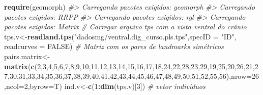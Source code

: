 \documentclass[
]{book}
\newenvironment{Shaded}{\begin{snugshade}}{\end{snugshade}}
\newcommand{\AttributeTok}[1]{\textcolor[rgb]{0.13,0.29,0.53}{#1}}
\newcommand{\CommentTok}[1]{\textcolor[rgb]{0.56,0.35,0.01}{\textit{#1}}}
\newcommand{\ConstantTok}[1]{\textcolor[rgb]{0.56,0.35,0.01}{#1}}
\newcommand{\DecValTok}[1]{\textcolor[rgb]{0.00,0.00,0.81}{#1}}
\newcommand{\FunctionTok}[1]{\textcolor[rgb]{0.13,0.29,0.53}{\textbf{#1}}}
\newcommand{\NormalTok}[1]{#1}
\newcommand{\OtherTok}[1]{\textcolor[rgb]{0.56,0.35,0.01}{#1}}
\newcommand{\SpecialCharTok}[1]{\textcolor[rgb]{0.81,0.36,0.00}{\textbf{#1}}}
\newcommand{\StringTok}[1]{\textcolor[rgb]{0.31,0.60,0.02}{#1}}
\begin{document}
\begin{Shaded}
\begin{Highlighting}[]
\FunctionTok{require}\NormalTok{(geomorph)}
\CommentTok{\#\textgreater{} Carregando pacotes exigidos: geomorph}
\CommentTok{\#\textgreater{} Carregando pacotes exigidos: RRPP}
\CommentTok{\#\textgreater{} Carregando pacotes exigidos: rgl}
\CommentTok{\#\textgreater{} Carregando pacotes exigidos: Matrix}
\CommentTok{\# Carregar arquivo tps com a vista ventral do crânio}
\NormalTok{tps.v}\OtherTok{\textless{}{-}}\FunctionTok{readland.tps}\NormalTok{(}\StringTok{"dadosmg/ventral.dig\_curso.pls.tps"}\NormalTok{,}\AttributeTok{specID =} \StringTok{"ID"}\NormalTok{, }\AttributeTok{readcurves =} \ConstantTok{FALSE}\NormalTok{)}
\CommentTok{\# Matriz com os pares de landmarks simétricos}
\NormalTok{pairs.matrix}\OtherTok{\textless{}{-}}
\FunctionTok{matrix}\NormalTok{(}\FunctionTok{c}\NormalTok{(}\DecValTok{2}\NormalTok{,}\DecValTok{3}\NormalTok{,}\DecValTok{4}\NormalTok{,}\DecValTok{5}\NormalTok{,}\DecValTok{6}\NormalTok{,}\DecValTok{7}\NormalTok{,}\DecValTok{8}\NormalTok{,}\DecValTok{9}\NormalTok{,}\DecValTok{10}\NormalTok{,}\DecValTok{11}\NormalTok{,}\DecValTok{12}\NormalTok{,}\DecValTok{13}\NormalTok{,}\DecValTok{14}\NormalTok{,}\DecValTok{15}\NormalTok{,}\DecValTok{16}\NormalTok{,}\DecValTok{17}\NormalTok{,}\DecValTok{18}\NormalTok{,}\DecValTok{24}\NormalTok{,}\DecValTok{22}\NormalTok{,}\DecValTok{28}\NormalTok{,}\DecValTok{23}\NormalTok{,}\DecValTok{29}\NormalTok{,}\DecValTok{19}\NormalTok{,}\DecValTok{25}\NormalTok{,}\DecValTok{20}\NormalTok{,}\DecValTok{26}\NormalTok{,}\DecValTok{21}\NormalTok{,}\DecValTok{27}\NormalTok{,}\DecValTok{30}\NormalTok{,}\DecValTok{31}\NormalTok{,}\DecValTok{33}\NormalTok{,}\DecValTok{34}\NormalTok{,}\DecValTok{35}\NormalTok{,}\DecValTok{36}\NormalTok{,}\DecValTok{37}\NormalTok{,}\DecValTok{38}\NormalTok{,}\DecValTok{39}\NormalTok{,}\DecValTok{40}\NormalTok{,}\DecValTok{41}\NormalTok{,}\DecValTok{42}\NormalTok{,}\DecValTok{43}\NormalTok{,}\DecValTok{44}\NormalTok{,}\DecValTok{45}\NormalTok{,}\DecValTok{46}\NormalTok{,}\DecValTok{47}\NormalTok{,}\DecValTok{48}\NormalTok{,}\DecValTok{49}\NormalTok{,}\DecValTok{50}\NormalTok{,}\DecValTok{51}\NormalTok{,}\DecValTok{52}\NormalTok{,}\DecValTok{55}\NormalTok{,}\DecValTok{56}\NormalTok{),}\AttributeTok{nrow=}\DecValTok{26}\NormalTok{,}\AttributeTok{ncol=}\DecValTok{2}\NormalTok{,}\AttributeTok{byrow=}\NormalTok{T)}
\NormalTok{ind.v}\OtherTok{\textless{}{-}}\FunctionTok{c}\NormalTok{(}\DecValTok{1}\SpecialCharTok{:}\FunctionTok{dim}\NormalTok{(tps.v)[}\DecValTok{3}\NormalTok{]) }\CommentTok{\# vetor indivíduos}

\end{Highlighting}
\end{Shaded}
\end{document}
